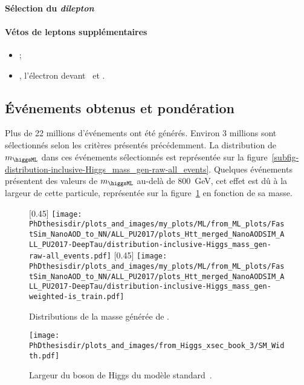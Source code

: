 \paragraph{Sélection du \emph{dilepton}}
\AtLeastOneOSPair{\ele\ele}
\IfMoreOnePair
\paragraph{Vétos de leptons supplémentaires}
\LeptonVetoes
\begin{itemize}
    \item \LeptonVetoesSecondMuon;
    \item \LeptonVetoesSecondEle, l'électron devant \PassConversionVeto\ et \LessTwoMissingHitsVertex.
\end{itemize}
\subsection{Événements obtenus et pondération}
Plus de 22 millions d'événements ont été générés.
Environ 3 millions sont sélectionnés selon les critères présentés précédemment.
La distribution de $m_{\higgsML}$ dans ces événements sélectionnés est représentée sur la figure~\ref{subfig-distribution-inclusive-Higgs_mass_gen-raw-all_events}.
Quelques événements présentent des valeurs de $m_{\higgsML}$ au-delà de \SI{800}{\GeV}, cet effet est dû à la largeur de cette particule,
représentée sur la figure~\ref{fig-_Higgs_xsec_book_3-SM_Width} en fonction de sa masse.
\begin{figure}[b]
\centering

[0.45\textwidth]
{\texttt{[image: \\PhDthesisdir/plots\_and\_images/my\_plots/ML/from\_ML\_plots/FastSim\_NanoAOD\_to\_NN/ALL\_PU2017/plots\_Htt\_merged\_NanoAODSIM\_ALL\_PU2017-DeepTau/distribution-inclusive-Higgs\_mass\_gen-raw-all\_events.pdf]}}
\hfill
{}[0.45\textwidth]
{\texttt{[image: \\PhDthesisdir/plots\_and\_images/my\_plots/ML/from\_ML\_plots/FastSim\_NanoAOD\_to\_NN/ALL\_PU2017/plots\_Htt\_merged\_NanoAODSIM\_ALL\_PU2017-DeepTau/distribution-inclusive-Higgs\_mass\_gen-weighted-is\_train.pdf]}}

\caption[Distributions de la masse générée de \higgsML.]{Distributions de la masse générée de \higgsML.}
\label{fig-distribution-inclusive-Higgs_mass_gen-raw-all_events}

\vspace{\baselineskip}

\texttt{[image: \\PhDthesisdir/plots\_and\_images/from\_Higgs\_xsec\_book\_3/SM\_Width.pdf]}
\caption[Largeur du boson de Higgs du modèle standard.]{Largeur du boson de Higgs du modèle standard~\cite{Higgs_xsec_book_3}.}
\label{fig-_Higgs_xsec_book_3-SM_Width}
\end{figure}
